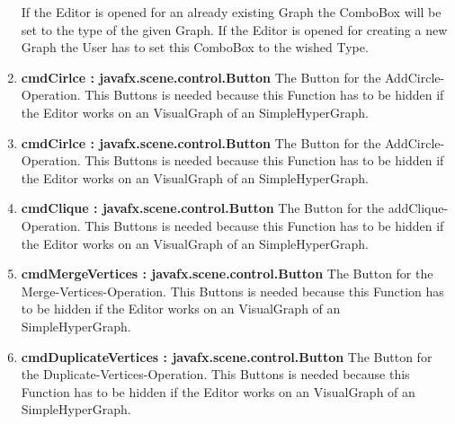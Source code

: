 \documentclass{article}
\begin{document}
\begin{enumerate}[-]
{						If the Editor is opened for an already existing Graph the ComboBox will be set to the type of the given Graph.
						If the Editor is opened for creating a new Graph the User has to set this ComboBox to the wished Type.
					}
					\item{
						\textbf{cmdCirlce : javafx.scene.control.Button} \newline
						The Button for the AddCircle-Operation.
						This Buttons is needed because this Function has to be hidden if the Editor works on an VisualGraph of an SimpleHyperGraph.
					}
					\item{
						\textbf{cmdCirlce : javafx.scene.control.Button} \newline
						The Button for the AddCircle-Operation.
						This Buttons is needed because this Function has to be hidden if the Editor works on an VisualGraph of an SimpleHyperGraph.
					}
					\item{
						\textbf{cmdClique : javafx.scene.control.Button} \newline
						The Button for the addClique-Operation.
						This Buttons is needed because this Function has to be hidden if the Editor works on an VisualGraph of an SimpleHyperGraph.
					}
					\item{
						\textbf{cmdMergeVertices : javafx.scene.control.Button} \newline
						The Button for the Merge-Vertices-Operation.
						This Buttons is needed because this Function has to be hidden if the Editor works on an VisualGraph of an SimpleHyperGraph.
					}
					\item{
						\textbf{cmdDuplicateVertices : javafx.scene.control.Button} \newline
						The Button for the Duplicate-Vertices-Operation.
						This Buttons is needed because this Function has to be hidden if the Editor works on an VisualGraph of an SimpleHyperGraph.
					}
				\end{enumerate}
\end{document}
